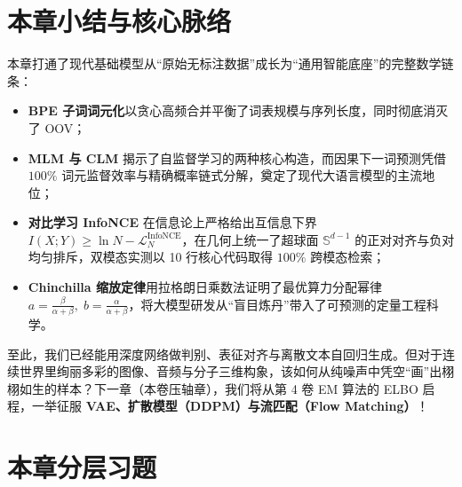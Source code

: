 \section*{本章小结与核心脉络}

本章打通了现代基础模型从“原始无标注数据”成长为“通用智能底座”的完整数学链条：
\begin{itemize}
  \item \textbf{BPE 子词词元化}以贪心高频合并平衡了词表规模与序列长度，同时彻底消灭了 OOV；
  \item \textbf{MLM 与 CLM} 揭示了自监督学习的两种核心构造，而因果下一词预测凭借 $100\%$ 词元监督效率与精确概率链式分解，奠定了现代大语言模型的主流地位；
  \item \textbf{对比学习 InfoNCE} 在信息论上严格给出互信息下界 $I(X; Y) \ge \ln N - \mathcal{L}_N^{\mathrm{InfoNCE}}$，在几何上统一了超球面 $\mathbb{S}^{d-1}$ 的正对对齐与负对均匀排斥，双模态实测以 10 行核心代码取得 $100\%$ 跨模态检索；
  \item \textbf{Chinchilla 缩放定律}用拉格朗日乘数法证明了最优算力分配幂律 $a = \frac{\beta}{\alpha+\beta},\; b = \frac{\alpha}{\alpha+\beta}$，将大模型研发从“盲目炼丹”带入了可预测的定量工程科学。
\end{itemize}
至此，我们已经能用深度网络做判别、表征对齐与离散文本自回归生成。但对于连续世界里绚丽多彩的图像、音频与分子三维构象，该如何从纯噪声中凭空“画”出栩栩如生的样本？下一章（本卷压轴章），我们将从第 4 卷 EM 算法的 ELBO 启程，一举征服 \textbf{VAE、扩散模型（DDPM）与流匹配（Flow Matching）}！

\section*{本章分层习题}


